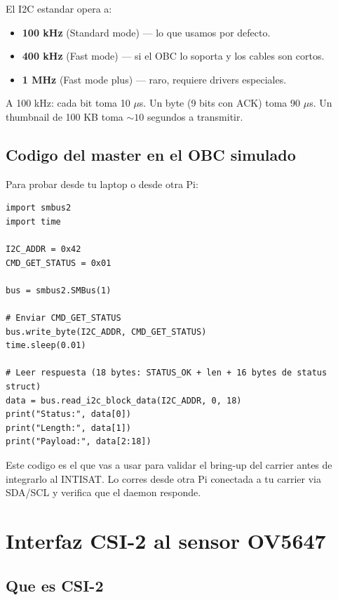 \documentclass[11pt,a4paper,oneside,openright]{book}
\begin{document}
El I2C estandar opera a:

\begin{itemize}[leftmargin=2em]
  \item \textbf{100 kHz} (Standard mode) --- lo que usamos por defecto.
  \item \textbf{400 kHz} (Fast mode) --- si el OBC lo soporta y los cables
        son cortos.
  \item \textbf{1 MHz} (Fast mode plus) --- raro, requiere drivers
        especiales.
\end{itemize}

A 100 kHz: cada bit toma 10 $\mu$s. Un byte (9 bits con ACK) toma 90 $\mu$s.
Un thumbnail de 100 KB toma $\sim 10$ segundos a transmitir.

\section{Codigo del master en el OBC simulado}

Para probar desde tu laptop o desde otra Pi:

\begin{lstlisting}
import smbus2
import time

I2C_ADDR = 0x42
CMD_GET_STATUS = 0x01

bus = smbus2.SMBus(1)

# Enviar CMD_GET_STATUS
bus.write_byte(I2C_ADDR, CMD_GET_STATUS)
time.sleep(0.01)

# Leer respuesta (18 bytes: STATUS_OK + len + 16 bytes de status struct)
data = bus.read_i2c_block_data(I2C_ADDR, 0, 18)
print("Status:", data[0])
print("Length:", data[1])
print("Payload:", data[2:18])
\end{lstlisting}

\begin{payload}
Este codigo es el que vas a usar para validar el bring-up del carrier
antes de integrarlo al INTISAT. Lo corres desde otra Pi conectada a tu
carrier via SDA/SCL y verifica que el daemon responde.
\end{payload}

\chapter{Interfaz CSI-2 al sensor OV5647}
\label{ch:csi}

\section{Que es CSI-2}
\end{document}
